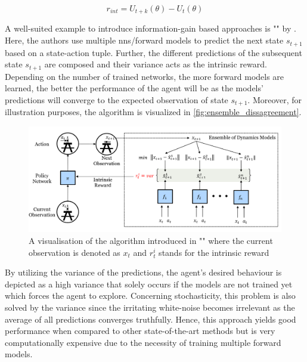 \documentclass[draft,final]{vutinfth} %
\newcommand{\p}[1]{see p. #1}
\begin{document}
    \begin{equation}
        r_{int}=U_{t+k}(\theta) - U_t(\theta)
    \end{equation}

    A well-suited example to introduce information-gain based approaches is "" by \citet{pathak_self-supervised_2019}.
    Here, the authors use multiple \glspl{nn}/forward models to predict the next state $s_{t+1}$ based on a state-action tuple.
    Further, the different predictions of the subsequent state $s_{t+1}$ are composed and their variance acts as the intrinsic reward.
    Depending on the number of trained networks, the more forward models are learned, the better the performance of the agent will be as the models' predictions will converge to the expected observation of state $s_{t+1}$.
    Moreover, for illustration purposes, the algorithm is visualized in \autoref{fig:ensemble_dissagreement}.


    \begin{figure}[h]
        \centering
        \includegraphics[width=\textwidth]{figures/ensemble_dissagreement.png}
        \caption[A visualisation of the algorithm introduced in ""]{A visualisation of the algorithm introduced in "" where the current observation is denoted as $x_t$ and $r_t^i$ stands for the intrinsic reward\protect\footnotemark}
        \label{fig:ensemble_dissagreement}
    \end{figure}

    \footnotetext{\citep[\p{2}]{pathak_self-supervised_2019}}

    By utilizing the variance of the predictions, the agent's desired behaviour is depicted as a high variance that solely occurs if the models are not trained yet which forces the agent to explore.
    Concerning stochasticity, this problem is also solved by the variance since the irritating white-noise becomes irrelevant as the average of all predictions converges truthfully.
    Hence, this approach yields good performance when compared to other state-of-the-art methods but is very computationally expensive due to the necessity of training multiple forward models.
\end{document}
